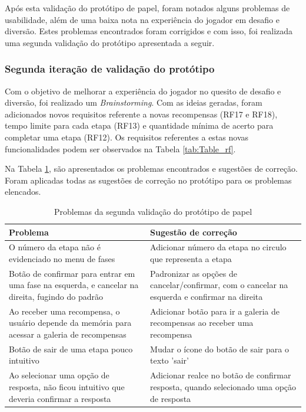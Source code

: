 \begin{apendicesenv}
{\newpage

Após esta validação do protótipo de papel, foram notados alguns problemas de usabilidade, além de uma baixa nota na experiência do jogador em desafio e diversão. Estes problemas encontrados foram corrigidos e com isso, foi realizada uma segunda validação do protótipo apresentada a seguir.

\subsubsection{Segunda iteração de validação do protótipo} \label{sssec:val-prot-papel-2}

Com o objetivo de melhorar a experiência do jogador no quesito de desafio e diversão, foi realizado um \textit{Brainstorming}. Com as ideias geradas, foram adicionados novos requisitos referente a novas recompensas (RF17 e RF18), tempo limite para cada etapa (RF13) e quantidade mínima de acerto para completar uma etapa (RF12). Os requisitos referentes a estas novas funcionalidades podem ser observados na Tabela \ref{tab:Table_rf}.

Na Tabela \ref{tab:Table_resultados_prototipo_de_papel_2}, são apresentados os problemas encontrados e sugestões de correção. Foram aplicadas todas as sugestões de correção no protótipo para os problemas elencados.

\begin{table}[htbp]
\centering
\caption{\textcolor{textadded}{Problemas da segunda validação do protótipo de papel}}
\begin{tabular}{|p{7.5cm}|p{7.5cm}|}
\hline
\textbf{\textcolor{textadded}{Problema}}                       & \textbf{\textcolor{textadded}{Sugestão de correção}} \\ \hline
\textcolor{textadded}{O número da etapa não é evidenciado no menu de fases} & \textcolor{textadded}{Adicionar número da etapa no circulo que representa a etapa}      \\ \hline
\textcolor{textadded}{Botão de confirmar para entrar em uma fase na esquerda, e cancelar na direita, fugindo do padrão} & \textcolor{textadded}{Padronizar as opções de cancelar/confirmar, com o cancelar na esquerda e confirmar na direita}      \\ \hline
\textcolor{textadded}{Ao receber uma recompensa, o usuário depende da memória para acessar a galeria de recompensas} & \textcolor{textadded}{Adicionar botão para ir a galeria de recompensas ao receber uma recompensa}      \\ \hline
\textcolor{textadded}{Botão de sair de uma etapa pouco intuitivo} & \textcolor{textadded}{Mudar o ícone do botão de sair para o texto 'sair'}      \\ \hline
\textcolor{textadded}{Ao selecionar uma opção de resposta, não ficou intuitivo que deveria confirmar a resposta} & \textcolor{textadded}{Adicionar realce no botão de confirmar resposta, quando selecionado uma opção de resposta}      \\ \hline
\end{tabular}
\label{tab:Table_resultados_prototipo_de_papel_2}
\end{table}

}
\end{apendicesenv}
